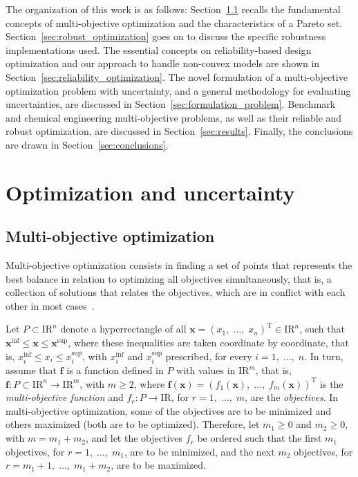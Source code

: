 \documentclass[final,5p,times,twocolumn,numbers]{elsarticle}
\begin{document}
The organization of this work is as follows: Section~\ref{sec:multiobjective_thoery} recalls the fundamental concepts of multi-objective optimization and the characteristics of a Pareto set. Section~\ref{sec:robust_optimization} goes on to discuss the specific robustness implementations used. The essential concepts on reliability-based design optimization and our approach to handle non-convex models are shown in Section~\ref{sec:reliability_optimization}. The novel formulation of a multi-objective optimization problem with uncertainty, and a general methodology for evaluating uncertainties, are discussed in Section~\ref{sec:formulation_problem}. Benchmark and chemical engineering multi-objective problems, as well as their reliable and robust optimization, are discussed in Section~\ref{sec:results}. Finally, the conclusions are drawn in Section~\ref{sec:conclusions}.

\section{Optimization and uncertainty}

\subsection{Multi-objective optimization} \label{sec:multiobjective_thoery}

Multi-objective optimization consists in finding a set of points that represents the best balance in relation to optimizing all objectives simultaneously, that is, a collection of solutions that relates the objectives, which are in conflict with each other in most cases~\cite{bib:babu2005}.

Let $ P \subset \mathrm{I\!R}^{n} $ denote a hyperrectangle of all $ \mathbf{x} = \left( x_{1}, \; \dots, \; x_{n} \right)^{\mathrm{T}} \in \mathrm{I\!R}^{n} $, such that $ \mathbf{x}^{\mathrm{inf}} \leq \mathbf{x} \leq \mathbf{x}^{\mathrm{sup}} $, where these inequalities are taken coordinate by coordinate, that is, $ x_{i}^{\mathrm{inf}} \leq x_{i} \leq x_{i}^{\mathrm{sup}} $, with $ x_{i}^{\mathrm{inf}} $ and $ x_{i}^{\mathrm{sup}} $ prescribed, for every $ i = 1, \; \dots, \; n $. In turn, assume that $ \mathbf{f} $ is a function defined in $ P $ with values in $ \mathrm{I\!R}^{m} $, that is, $ \mathbf{f} : P \subset \mathrm{I\!R}^{n} \rightarrow \mathrm{I\!R}^{m} $, with $ m \geq 2 $, where $ \mathbf{f} \left( \mathbf{x} \right) = \left( f_{1} \left( \mathbf{x} \right), \; \dots, \; f_{m} \left( \mathbf{x} \right) \right)^{\mathrm{T}} $ is the \textit{multi-objective function} and $ f_{r} : P \rightarrow \mathrm{I\!R} $, for $ r = 1, \; \dots, \; m $, are the \textit{objectives}. In multi-objective optimization, some of the objectives are to be minimized and others maximized (both are to be optimized). Therefore, let $ m_{1} \geq 0 $ and $ m_{2} \geq 0 $, with $ m = m_{1} + m_{2} $, and let the objectives $ f_{r} $ be ordered such that the first $ m_{1} $ objectives, for $ r = 1, \; \dots, \; m_{1} $, are to be minimized, and the next $ m_{2} $ objectives, for $ r = m_{1} + 1, \; \dots, \; m_{1} + m_{2} $, are to be maximized.
\end{document}
